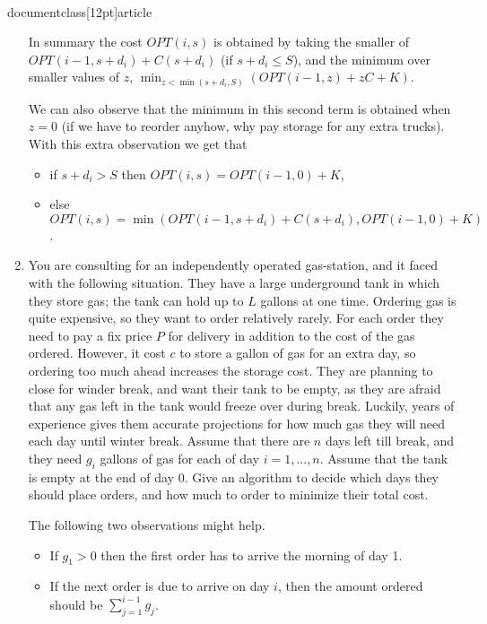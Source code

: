 \\documentclass[12pt]{article}
\def\opt{{OPT}}
\def\opt{{OPT}}
\begin{document}
\begin{enumerate}
{\begin{itemize}
In summary the cost $\opt(i,s)$ is obtained by taking the smaller
of $\opt(i-1,s+d_i)+C(s+d_i)$ (if $s+d_i \le S$), and the minimum over
smaller values of $z$, $\min_{z <\min(s+d_i,S)} (\opt(i-1, z)+zC+K)$.

We can also observe that the minimum in this second term is
obtained when $z=0$ (if we have to reorder anyhow, why pay storage for
any extra trucks). With this extra observation we get that
\begin{itemize}
\item if $s+d_i>S$ then $\opt(i,s)=\opt(i-1,0)+K$,
\item else $\opt(i,s)=\min(\opt(i-1,s+d_i)+C(s+d_i), \opt(i-1,0)+K)$.
\end{itemize}
\end{itemize}

}


\item

You are consulting for an independently operated gas-station,
and it faced with the following situation.
They have a large underground tank in which they store gas;
the tank can hold up to $L$ gallons at one time.
Ordering gas is quite expensive, so they want to order relatively rarely.  
For each order
they need to pay a fix price $P$ for delivery in addition to the cost
of the gas ordered. However, it cost $c$ to store a gallon of gas for an
extra day, so ordering too much ahead increases the storage cost. They are
planning to close for winder break, and want their tank to be empty, as they
are afraid that any gas left in the tank would freeze over during break.
Luckily, years of experience gives them accurate projections for
how much gas they will need each day until winter break. 
Assume that there are $n$ days left till break, and
they need $g_i$ gallons of gas for each of day $i=1,...,n$. Assume that the
tank is empty at the end of day 0. Give an algorithm to decide which days
they should place orders, and how much to order to minimize their total cost.

The following two observations might help.
\begin{itemize}
\item If $g_1 >0$ then the first
order has to arrive the morning of day 1.
\item If the next order is due to
arrive on day $i$, then the amount ordered should be $\sum_{j=1}^{i-1}g_j$.
\end{itemize}



\end{enumerate}
\end{document}
